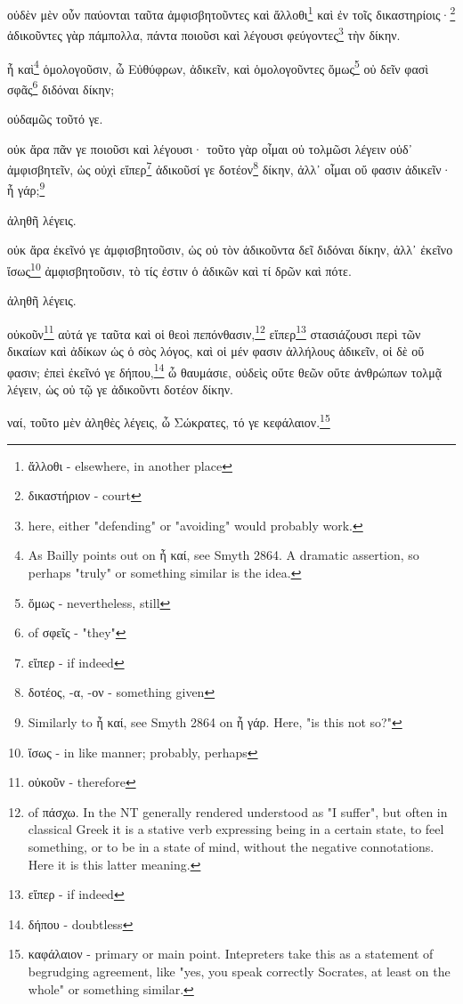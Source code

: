οὐδὲν
μὲν
οὖν
παύονται
ταῦτα
ἀμφισβητοῦντες
καὶ
ἄλλοθι\footnote{ἄλλοθι - elsewhere, in another place}
καὶ
ἐν
τοῖς
δικαστηρίοις·\footnote{δικαστήριον - court}
ἀδικοῦντες
γὰρ
πάμπολλα,
πάντα
ποιοῦσι
καὶ
λέγουσι
φεύγοντες\footnote{here, either "defending" or "avoiding" would probably work.}
τὴν
δίκην.

ἦ
καὶ\footnote{As Bailly points out on ἦ καί, see Smyth 2864. A dramatic assertion, so perhaps "truly" or something similar is the idea.}
ὁμολογοῦσιν,
ὦ
Εὐθύφρων,
ἀδικεῖν,
καὶ
ὁμολογοῦντες
ὅμως\footnote{ὅμως - nevertheless, still}
οὐ
δεῖν
φασὶ
σφᾶς\footnote{ of σφεῖς - "they"}
διδόναι
δίκην;

οὐδαμῶς
τοῦτό
γε.

οὐκ
ἄρα
πᾶν
γε
ποιοῦσι
καὶ
λέγουσι·
τοῦτο
γὰρ
οἶμαι
οὐ
τολμῶσι
λέγειν
οὐδ᾽
ἀμφισβητεῖν,
ὡς
οὐχὶ
εἴπερ\footnote{εἴπερ - if indeed}
\versification{[8d]}
ἀδικοῦσί
γε
δοτέον\footnote{δοτέος, -α, -ον - something given}
δίκην,
ἀλλ᾽
οἶμαι
οὔ
φασιν
ἀδικεῖν·
ἦ
γάρ;\footnote{Similarly to ἦ καί, see Smyth 2864 on ἦ γάρ. Here, "is this not so?"}

ἀληθῆ
λέγεις.

οὐκ
ἄρα
ἐκεῖνό
γε
ἀμφισβητοῦσιν,
ὡς
οὐ
τὸν
ἀδικοῦντα
δεῖ
διδόναι
δίκην,
ἀλλ᾽
ἐκεῖνο
ἴσως\footnote{ἵσως - in like manner; probably, perhaps}
ἀμφισβητοῦσιν,
τὸ
τίς
ἐστιν
ὁ
ἀδικῶν
καὶ
τί
δρῶν
καὶ
πότε.

ἀληθῆ
λέγεις.

οὐκοῦν\footnote{οὐκοῦν - therefore}
αὐτά
γε
ταῦτα
καὶ
οἱ
θεοὶ
πεπόνθασιν,\footnote{ of πάσχω. In the NT generally rendered understood as "I suffer", but often in classical Greek it is a stative verb expressing being in a certain state, to feel something, or to be in a state of mind, without the negative connotations. Here it is this latter meaning.}
εἴπερ\footnote{εἴπερ - if indeed}
στασιάζουσι
περὶ
τῶν
δικαίων
καὶ
ἀδίκων
ὡς
ὁ
σὸς
λόγος,
καὶ
οἱ
μέν
φασιν
ἀλλήλους
ἀδικεῖν,
οἱ
δὲ
οὔ
φασιν;
ἐπεὶ
ἐκεῖνό
γε
δήπου,\footnote{δήπου - doubtless}
ὦ
θαυμάσιε,
οὐδεὶς
οὔτε
θεῶν
οὔτε
\versification{[8e]}
ἀνθρώπων
τολμᾷ
λέγειν,
ὡς
οὐ
τῷ
γε
ἀδικοῦντι
δοτέον
δίκην.

ναί,
τοῦτο
μὲν
ἀληθὲς
λέγεις,
ὦ
Σώκρατες,
τό
γε
κεφάλαιον.\footnote{καφάλαιον - primary or main point. Intepreters take this as a statement of begrudging agreement, like "yes, you speak correctly Socrates, at least on the whole" or something similar.}

